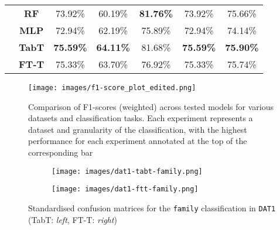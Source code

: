 \begin{table}[]
\begin{tabular}{ccccccc}
& \textbf{RF}                       & 73.92\%                        & 60.19\%                       & {\cellcolor{my_blue}\textbf{81.76\%}} & 73.92\%                        & 75.66\%                           \\
& {\cellcolor{my_grey}}\textbf{MLP}                      & {\cellcolor{my_grey}}72.94\%                        & {\cellcolor{my_grey}}62.19\%                       & {\cellcolor{my_grey}}75.89\%                       & {\cellcolor{my_grey}}72.94\%                        & {\cellcolor{my_grey}}74.14\%                           \\
\hhline{~------}
& \textbf{TabT}                     & {\cellcolor{my_blue}\textbf{75.59\%}}                        & {\cellcolor{my_blue}\textbf{64.11\%}}                       & 81.68\%                       & {\cellcolor{my_blue}\textbf{75.59\%}}                        & {\cellcolor{my_blue}\textbf{75.90\%}}                           \\
& {\cellcolor{my_grey}}\textbf{FT-T}                     & {\cellcolor{my_grey}}75.33\% & {\cellcolor{my_grey}}63.70\% & {\cellcolor{my_grey}}76.92\% & {\cellcolor{my_grey}}75.33\% & {\cellcolor{my_grey}}75.74\%  \\ 
\hline\hline
\end{tabular}
\label{tab:metrics-DAT3}
\end{table}


\vfill

\begin{figure}[]
    \centering
    \texttt{[image: images/f1-score\_plot\_edited.png]}
    \caption{Comparison of F1-scores (weighted) across tested models for various datasets and classification tasks. Each experiment represents a dataset and granularity of the classification, with the highest performance for each experiment annotated at the top of the corresponding bar}
    \label{fig:results}
\end{figure}

\vfill

\clearpage


\begin{figure}[]
    \centering
    \begin{subfigure}{0.42\textwidth}
        \centering
        \texttt{[image: images/dat1-tabt-family.png]}
        \label{fig:conf-matrix-1a}
    \end{subfigure}
    \begin{subfigure}{0.42\textwidth}
        \centering
        \texttt{[image: images/dat1-ftt-family.png]}
        \label{fig:conf-matrix-1b}
    \end{subfigure}
    \vspace{-15pt}
    \caption{Standardised confusion matrices for the \texttt{family} classification in \texttt{DAT1} (TabT: \textit{left}, FT-T: \textit{right})}
    \label{fig:conf-matrix-dat1}
\end{figure}

